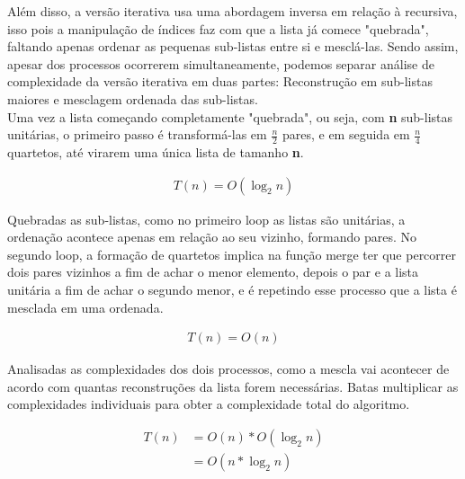 \begin{algorithm}
	\begin{algorithmic}[0]


		\EndFor
		\EndFor
	\end{algorithmic}
\end{algorithm}

Além disso, a versão iterativa usa uma abordagem inversa em relação à recursiva, isso pois a manipulação de índices faz com que a lista já comece "quebrada", faltando apenas ordenar as pequenas sub-listas entre si e mesclá-las. Sendo assim, apesar dos processos ocorrerem simultaneamente, podemos separar análise de complexidade da versão iterativa em duas partes: Reconstrução em sub-listas maiores e mesclagem ordenada das sub-listas.\\

Uma vez a lista começando completamente "quebrada", ou seja, com \textbf{n} sub-listas unitárias, o primeiro passo é transformá-las em \textbf{$\frac{n}{2}$} pares, e em seguida em \textbf{$\frac{n}{4}$} quartetos, até virarem uma única lista de tamanho \textbf{n}.

\begin{align*}
  T(n) = O(\log_2{n})
\end{align*}

Quebradas as sub-listas, como no primeiro loop as listas são unitárias, a ordenação acontece apenas em relação ao seu vizinho, formando pares. No segundo loop, a formação de quartetos implica na função merge ter que percorrer dois pares vizinhos a fim de achar o menor elemento, depois o par e a lista unitária a fim de achar o segundo menor, e é repetindo esse processo que a lista é mesclada em uma ordenada.

\begin{align*}
  T(n) = O(n)
\end{align*}

Analisadas as complexidades dos dois processos, como a mescla vai acontecer de acordo com quantas reconstruções da lista forem necessárias. Batas multiplicar as complexidades individuais para obter a complexidade total do algoritmo.

\begin{align*}
  T(n) & = O(n) * O(\log_2{n})\\ 
       & = O(n*\log_2{n})
\end{align*}

